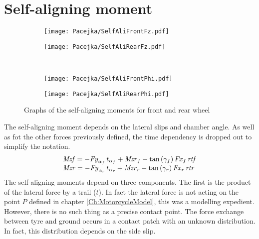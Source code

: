 \section{Self-aligning moment}
%
\begin{figure}%
    \begin{subfigure}{.5\textwidth}
        \texttt{[image: Pacejka/SelfAliFrontFz.pdf]}
        \caption{}
        \label{fig:sa1a}
    \end{subfigure}%
    \begin{subfigure}{.5\textwidth}
        \texttt{[image: Pacejka/SelfAliRearFz.pdf]}
        \caption{}
        \label{fig:sa1b}
    \end{subfigure}\\
    \begin{subfigure}{.5\textwidth}
        \texttt{[image: Pacejka/SelfAliFrontPhi.pdf]}
        \caption{}
        \label{fig:sa1c}
    \end{subfigure}%
    \begin{subfigure}{.5\textwidth}
        \texttt{[image: Pacejka/SelfAliRearPhi.pdf]}
        \caption{}
        \label{fig:sa1d}
    \end{subfigure}
    \caption{Graphs of the self-aligning moments for front and rear wheel}
\end{figure}
%
%
The self-aligning moment depends on the lateral slips and chamber angle. As well as fot the other forces previously defined, the time dependency is dropped out to simplify the notation.  
%
\begin{equation}
    \begin{array}{l} 
        {\it Mzf}  =-{\it Fy}_{
        \alpha_{f}}\,t_{\alpha_{f}}+{\it Mzr}_{f}-\tan \left( \gamma_{f}
         \right) {\it Fx}_{f}\,{\it rtf}\\ {\it Mzr} =-{\it Fy}_{\alpha_{r}}\,t_{\alpha_{r}}+{\it Mzr}_{r}-\tan
         \left( \gamma_{r} \right) {\it Fx}_{r}\,{\it rtr}
    \end{array}          
\end{equation}
%
The self-aligning moments depend on three components. The first is the product of the lateral force by a trail ($t$). In fact the lateral force is not acting on the point $P$ defined in chapter \ref{Ch:MotorcycleModel}, this was a modelling expedient. However, there is no such thing as a precise contact point. The force exchange between tyre and ground occurs in a contact patch with an unknown distribution. In fact, this distribution depends on the side slip.\\
